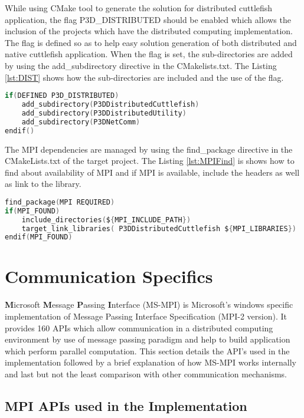 While using CMake tool to generate the solution for distributed cuttlefish application, the flag P3D\_DISTRIBUTED should be enabled which allows the inclusion of the projects which have the distributed computing implementation. The flag is defined so as to help easy solution generation of both distributed and native cuttlefish application. When the flag is set, the sub-directories are added by using the add\_subdirectory directive in the CMakelists.txt. The Listing \ref{lst:DIST} shows how the sub-directories are included and the use of the flag.

\begin{lstlisting}[language=C,label={lst:DIST},caption={Flag to enable distributed computing solution}]
if(DEFINED P3D_DISTRIBUTED)
	add_subdirectory(P3DDistributedCuttlefish)
	add_subdirectory(P3DDistributedUtility)
	add_subdirectory(P3DNetComm)
endif()
\end{lstlisting}

The MPI dependencies are managed by using the find\_package directive in the CMakeLists.txt of the target project. The Listing \ref{lst:MPIFind} is shows how to find about availability of MPI and if MPI is available, include the headers as well as link to the library. 

\begin{lstlisting}[language=C,label={lst:MPIFind},caption={find\_package use for MPI libraries}]
find_package(MPI REQUIRED)
if(MPI_FOUND)
	include_directories(${MPI_INCLUDE_PATH})
	target_link_libraries( P3DDistributedCuttlefish ${MPI_LIBRARIES})
endif(MPI_FOUND)
\end{lstlisting}

\section{Communication Specifics}

\textbf{M}icrosoft \textbf{M}essage \textbf{P}assing \textbf{I}nterface (MS-MPI) is Microsoft's windows specific implementation of Message Passing Interface Specification  (MPI-2 version). It provides 160 APIs which allow communication in a distributed computing environment by use of message passing paradigm and help to build application which perform parallel computation. This section details the API's used in the implementation followed by a brief explanation of how MS-MPI works internally and last but not the least comparison with other communication mechanisms.

\subsection{MPI APIs used in the Implementation} \label{MSMPI-API} 

